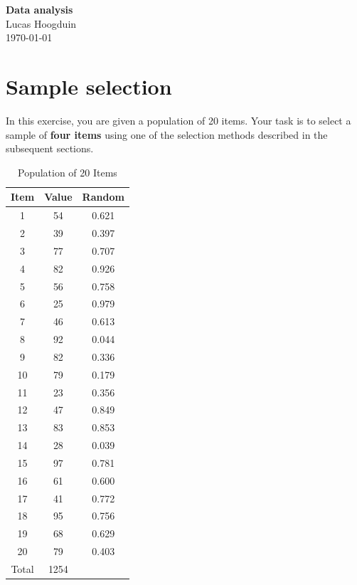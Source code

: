 \documentclass[12pt,a4paper]{memoir}
\begin{document}
\thispagestyle{empty}
\begin{center}
    \vspace*{2in}
    {\Huge \textbf{Data analysis}} \\
    \vspace{0.5in}
    {\Large Lucas Hoogduin} \\
    \vspace{0.5in}
    {\large \today}
\end{center}
\newpage

\tableofcontents
\newpage

\chapter{Sample selection}

In this exercise, you are given a population of 20 items. Your task is to select a sample of \textbf{four items} using one of the selection methods described in the subsequent sections.

\begin{table}[htbp]
\centering
\caption{Population of 20 Items}
\label{tab:population_20_items}
\begin{tabularx}{\textwidth}{@{}ccc@{}}
\toprule
\textbf{Item} & \textbf{Value} & \textbf{Random} \\
\midrule
1  & 54 & 0.621 \\
2  & 39 & 0.397 \\
3  & 77 & 0.707 \\
4  & 82 & 0.926 \\
5  & 56 & 0.758 \\
6  & 25 & 0.979 \\
7  & 46 & 0.613 \\
8  & 92 & 0.044 \\
9  & 82 & 0.336 \\
10 & 79 & 0.179 \\
11 & 23 & 0.356 \\
12 & 47 & 0.849 \\
13 & 83 & 0.853 \\
14 & 28 & 0.039 \\
15 & 97 & 0.781 \\
16 & 61 & 0.600 \\
17 & 41 & 0.772 \\
18 & 95 & 0.756 \\
19 & 68 & 0.629 \\
20 & 79 & 0.403 \\
\midrule
Total & 1254 & \\
\bottomrule
\end{tabularx}
\end{table}
\end{document}
